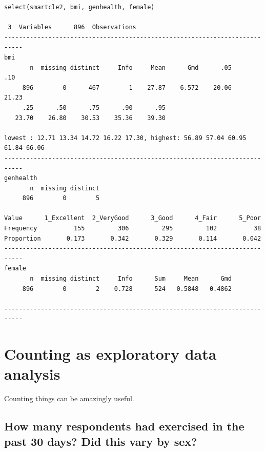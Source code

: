\documentclass[]{book}
\newenvironment{Shaded}{\begin{snugshade}}{\end{snugshade}}
\newcommand{\KeywordTok}[1]{\textcolor[rgb]{0.13,0.29,0.53}{\textbf{#1}}}
\newcommand{\DataTypeTok}[1]{\textcolor[rgb]{0.13,0.29,0.53}{#1}}
\newcommand{\DecValTok}[1]{\textcolor[rgb]{0.00,0.00,0.81}{#1}}
\newcommand{\StringTok}[1]{\textcolor[rgb]{0.31,0.60,0.02}{#1}}
\newcommand{\OperatorTok}[1]{\textcolor[rgb]{0.81,0.36,0.00}{\textbf{#1}}}
\newcommand{\NormalTok}[1]{#1}
\theoremstyle{definition}
\theoremstyle{definition}
\theoremstyle{definition}
\theoremstyle{remark}
\begin{document}
\begin{verbatim}
select(smartcle2, bmi, genhealth, female) 

 3  Variables      896  Observations
---------------------------------------------------------------------------
bmi 
       n  missing distinct     Info     Mean      Gmd      .05      .10 
     896        0      467        1    27.87    6.572    20.06    21.23 
     .25      .50      .75      .90      .95 
   23.70    26.80    30.53    35.36    39.30 

lowest : 12.71 13.34 14.72 16.22 17.30, highest: 56.89 57.04 60.95 61.84 66.06
---------------------------------------------------------------------------
genhealth 
       n  missing distinct 
     896        0        5 
                                                                      
Value      1_Excellent  2_VeryGood      3_Good      4_Fair      5_Poor
Frequency          155         306         295         102          38
Proportion       0.173       0.342       0.329       0.114       0.042
---------------------------------------------------------------------------
female 
       n  missing distinct     Info      Sum     Mean      Gmd 
     896        0        2    0.728      524   0.5848   0.4862 

---------------------------------------------------------------------------
\end{verbatim}

\section{Counting as exploratory data
analysis}\label{counting-as-exploratory-data-analysis}

Counting things can be amazingly useful.

\subsection{How many respondents had exercised in the past 30 days? Did
this vary by
sex?}\label{how-many-respondents-had-exercised-in-the-past-30-days-did-this-vary-by-sex}

\begin{Shaded}
\end{Shaded}
\end{document}
